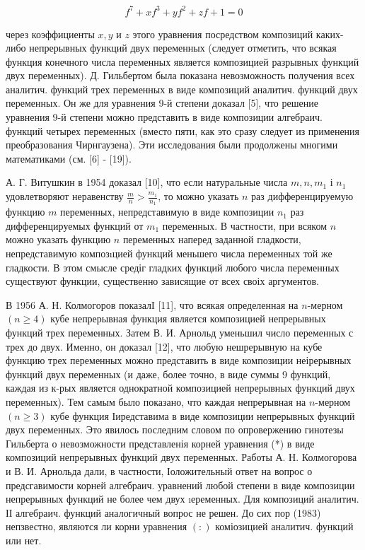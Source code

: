 \documentclass[10pt]{article}
\begin{document}
\[

f^{7}+x f^{3}+y f^{2}+z f+1=0

\]



через коэффициенты $x, y$ и $z$ этого уравнения посредством композиций каких-либо непрерывных функций двух переменных (следует отметить, что всякая функция конечного числа переменных является композицией разрывных функций двух переменных). Д. Гильбертом была показана невозможность получения всех аналитич. функций трех переменных в виде композиций аналитич. функций двух переменных. Он же для уравнения 9-й степени доказал [5], что решение уравнения 9-й степени можно представить в виде композиции алгебраич. функций четырех переменных (вместо пяти, как это сразу следует из применения преобразования Чирнгаузена). Эти исследования были продолжены многими математиками (см. [6] - [19]).



А. Г. Витушкин в 1954 доказал [10], что если натуральные числа $m, n, m_{1}$ і $n_{1}$ удовлетворяют неравенству $\frac{m}{n}>\frac{m_{1}}{n_{1}}$, то можно указать $n$ раз дифференцируемую функцию $m$ переменных, непредставимую в виде композиции $n_{1}$ раз дифференцируемых функций от $m_{1}$ переменных. В частности, при всяком $n$ можно указать функцию $n$ переменных наперед заданной гладкости, непредставимую композıцией функций меньшего числа переменных той же гладкости. В этом смысле средіг гладких функций любого числа переменных существуют функции, существенно зависящие от всех своіх аргументов.



В 1956 А. Н. Колмогоров показалІ [11], что всякая определенная на $n$-мерном $(n \geqslant 4)$ кубе непрерывная функция является композицией непрерывных функций трех переменных. Затем В. И. Арнольд уменьшил число переменных с трех до двух. Именно, он доказал [12], что любую нешрерывную на кубе функцию трех переменных можно представить в виде композиции неірерывных функций двух переменных (и даже, более точно, в виде суммы 9 функций, каждая из к-рых является однократной композицией непрерывных функций двух переменных). Тем самым было показано, что каждая непрерывная на $n$-мерном $(n \geqslant 3)$ кубе функция Іиредставима в виде композиции непрерывных функций двух переменных. Это явилось последним словом по опровержению гинотезы Гильберта о невозможности представленія корней уравнения (*) в виде композиций непрерывных функций двух переменных. Работы А. Н. Колмогорова и В. И. Арнольда дали, в частности, Іоложительный ответ на вопрос о предсгавимости корней алгебраич. уравнений любой степени в виде композиции непрерывных функций не более чем двух ıеременных. Для композиций аналитич. ІІ алгебраич. функций аналогичный вопрос не решен. До сих пор (1983) непзвестно, являются ли корни уравнения $(:)$ коміозицией аналитич. функций или нет.
\end{document}
